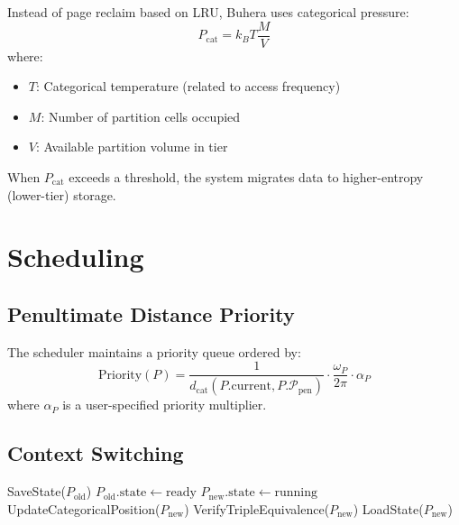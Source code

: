 \documentclass[twocolumn,10pt]{article}
\theoremstyle{definition}
\theoremstyle{remark}
\newcommand{\pentstate}{\mathcal{P}_{\text{pen}}}
\newcommand{\dcat}{d_{\text{cat}}}
\begin{document}
Instead of page reclaim based on LRU, Buhera uses categorical pressure:
\begin{equation}
    P_{\text{cat}} = k_B T \frac{M}{V}
\end{equation}
where:
\begin{itemize}
    \item $T$: Categorical temperature (related to access frequency)
    \item $M$: Number of partition cells occupied
    \item $V$: Available partition volume in tier
\end{itemize}

When $P_{\text{cat}}$ exceeds a threshold, the system migrates data to higher-entropy (lower-tier) storage.

\section{Scheduling}
\label{sec:scheduling}

\subsection{Penultimate Distance Priority}

The scheduler maintains a priority queue ordered by:
\begin{equation}
    \text{Priority}(P) = \frac{1}{\dcat(P.\text{current}, P.\pentstate)} \cdot \frac{\omega_P}{2\pi} \cdot \alpha_P
\end{equation}
where $\alpha_P$ is a user-specified priority multiplier.

\subsection{Context Switching}

\begin{algorithm}
\caption{Context Switch}
\begin{algorithmic}[1]
    \State SaveState($P_{\text{old}}$)
    \State $P_{\text{old}}.\text{state} \gets \text{ready}$
    \State $P_{\text{new}}.\text{state} \gets \text{running}$
    \State UpdateCategoricalPosition($P_{\text{new}}$)
    \State VerifyTripleEquivalence($P_{\text{new}}$)
    \State LoadState($P_{\text{new}}$)
\EndFunction
\end{algorithmic}
\end{algorithm}
\end{document}
